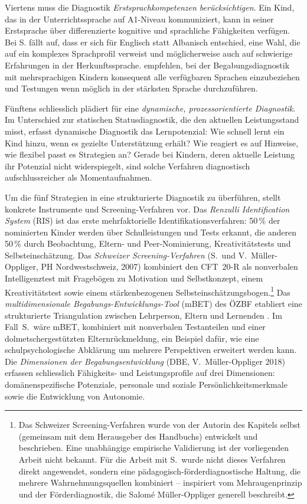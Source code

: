 \documentclass[ngerman, a4paper]{article}
\begin{document}
Viertens muss die Diagnostik \textit{Erstsprachkompetenzen berücksichtigen}. Ein Kind,
das in der Unterrichtssprache auf A1-Niveau kommuniziert, kann in seiner Erstsprache
über differenzierte kognitive und sprachliche Fähigkeiten verfügen. Bei S. fällt auf,
dass er sich für Englisch statt Albanisch entschied, eine Wahl, die auf ein komplexes
Sprachprofil verweist und möglicherweise auch auf schwierige Erfahrungen in der
Herkunftssprache. \textcite[S.\,76--78]{kellerkoller2021hellekoepfe}
empfehlen, bei der Begabungsdiagnostik mit mehrsprachigen Kindern konsequent
alle verfügbaren Sprachen einzubeziehen und Testungen wenn möglich in der
stärksten Sprache durchzuführen.

Fünftens schliesslich plädiert
\textcite[S.\,224--238]{muelleroppliger2021paeddiagnostik} für eine
\textit{dynamische, prozessorientierte Diagnostik}. Im Unterschied zur
statischen Statusdiagnostik, die den aktuellen Leistungsstand misst,
erfasst dynamische Diagnostik das Lernpotenzial: Wie schnell lernt ein
Kind hinzu, wenn es gezielte Unterstützung erhält? Wie reagiert es auf
Hinweise, wie flexibel passt es Strategien an? Gerade bei Kindern,
deren aktuelle Leistung ihr Potenzial nicht widerspiegelt, sind solche
Verfahren diagnostisch aufschlussreicher als Momentaufnahmen.

Um die fünf Strategien in eine strukturierte Diagnostik zu überführen,
stellt \textcite[S.\,231--235]{muelleroppliger2021paeddiagnostik}
konkrete Instrumente und Screening-Verfahren vor. Das \textit{Renzulli
Identification System} (RIS) ist das erste mehrfaktorielle
Identifikationsverfahren: 50\,\% der nominierten Kinder werden über
Schulleistungen und Tests erkannt, die anderen 50\,\% durch Beobachtung,
Eltern- und Peer-Nominierung, Kreativitätstests und Selbsteinschätzung.
Das \textit{Schweizer Screening-Verfahren} (S.\ und V.\ Müller-Oppliger,
PH Nordwestschweiz, 2007) kombiniert den CFT~20-R als nonverbalen
Intelligenztest mit Fragebögen zu Motivation und Selbstkonzept, einem
Kreativitätstest sowie einem stärkenbezogenen
Selbsteinschätzungsbogen.\footnote{Das Schweizer Screening-Verfahren
wurde von der Autorin des Kapitels selbst (gemeinsam mit dem
Herausgeber des Handbuchs) entwickelt und beschrieben. Eine
unabhängige empirische Validierung ist der vorliegenden Arbeit nicht
bekannt. Für die Arbeit mit S.\ wurde nicht dieses Verfahren direkt
angewendet, sondern eine pädagogisch-förderdiagnostische Haltung, die
mehrere Wahrnehmungsquellen kombiniert -- inspiriert vom
Mehraugenprinzip und der Förderdiagnostik, die Salomé
Müller-Oppliger generell beschreibt.}
Das \textit{multidimensionale Begabungs-Entwicklungs-Tool} (mBET) des
ÖZBF etabliert eine strukturierte Triangulation zwischen Lehrperson,
Eltern und Lernenden \parencite[S.\,252--259]{stahl2021mbet}. Im Fall~S.\ wäre mBET,
kombiniert mit nonverbalen Testanteilen und einer dolmetschergestützten
Elternrückmeldung, ein Beispiel dafür, wie eine schulpsychologische
Abklärung um mehrere Perspektiven erweitert werden kann. Die
\textit{Dimensionen der Begabungsentwicklung} (DBE, V.\ Müller-Oppliger
2018) erfassen schliesslich Fähigkeits- und Leistungsprofile auf drei
Dimensionen: domänenspezifische Potenziale, personale und soziale
Persönlichkeitsmerkmale sowie die Entwicklung von Autonomie.
\end{document}
